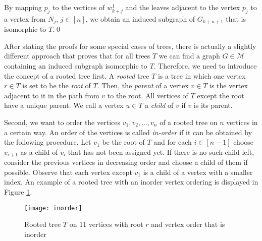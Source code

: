 \begin{prf}
By mapping $p_j$ to the vertices of $w^1_{k+j}$ and the leaves adjacent to the vertex $p_j$ to a vertex from $N_j$, $j\in [n]$, we obtain an induced subgraph of $G_{k+n+1}$ that is isomorphic to $T$.\qed
\end{prf}

After stating the proofs for some special cases of trees, there is actually a slightly different approach that proves that for all trees $T$ we can find a graph $G\in\mathcal{M}$ containing an induced subgraph isomorphic to $T$. Therefore, we need to introduce the concept of a rooted tree first. A \textit{rooted} tree $T$ is a tree in which one vertex $r\in T$ is set to be the \textit{root} of $T$. Then, the \textit{parent} of a vertex $v\in T$ is the vertex adjacent to it in the path from $v$ to the root. All vertices of $T$ except the root have a unique parent. We call a vertex $u\in T$ a \textit{child} of $v$ if $v$ is its parent.

Second, we want to order the vertices $v_1, v_2, \dots , v_n$ of a rooted tree on $n$ vertices in a certain way. An order of the vertices is called \textit{in-order} if it can be obtained by the following procedure. Let $v_1$ be the root of $T$ and for each $i\in [n-1]$ choose $v_{i+1}$ as a child of $v_i$ that has not been assigned yet. If there is no such child left, consider the previous vertices in decreasing order and choose a child of them if possible. Observe that each vertex except $v_1$ is a child of a vertex with a smaller index. An example of a rooted tree with an inorder vertex ordering is displayed in Figure \ref{f4my}.\\


\begin{figure}[ht]
\begin{center}
\texttt{[image: inorder]}
\end{center}
\caption{Rooted tree $T$ on $11$ vertices with root $r$ and vertex order that is inorder}
\label{f4my}
\end{figure}



